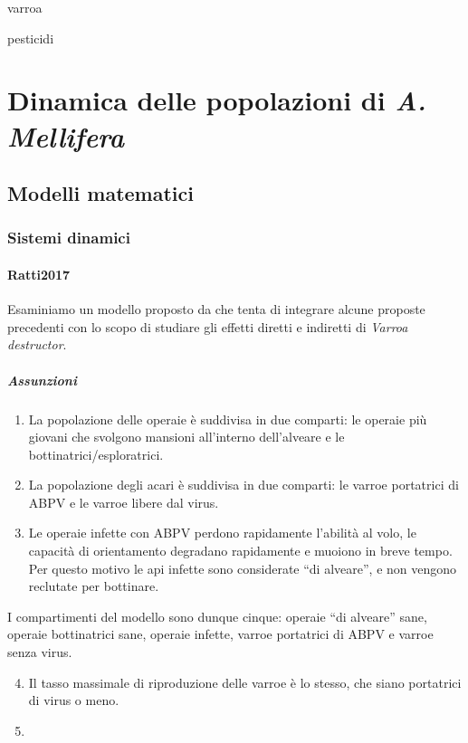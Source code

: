 \documentclass[11pt,a4paper]{book} %
\begin{document}
varroa

pesticidi


\mainmatter

\part{Dinamica delle popolazioni di \emph{A. Mellifera}}





\chapter[Modelli]{Modelli matematici}
\section{Sistemi dinamici}

\subsection{Ratti2017}
Esaminiamo un modello proposto da \citeauthor{ratti2017} che tenta di integrare alcune proposte precedenti con lo scopo di studiare gli effetti diretti e indiretti di \emph{Varroa destructor}.

\subsubsection{Assunzioni}
\begin{enumerate}
    \item La popolazione delle operaie è suddivisa in due comparti: le operaie più giovani che svolgono mansioni all'interno dell'alveare e le bottinatrici/esploratrici.
    \item La popolazione degli acari è suddivisa in due comparti: le varroe portatrici di ABPV e le varroe libere dal virus.
    \item Le operaie infette con ABPV perdono rapidamente l'abilità al volo, le capacità di orientamento degradano rapidamente e muoiono in breve tempo. Per questo motivo le api infette sono considerate ``di alveare'', e non vengono reclutate per bottinare.
\end{enumerate}

I compartimenti del modello sono dunque cinque: operaie ``di alveare'' sane, operaie bottinatrici sane, operaie infette, varroe portatrici di ABPV e varroe senza virus.

\begin{enumerate}
    \setcounter{enumi}{3}
    \item Il tasso massimale di riproduzione delle varroe è lo stesso, che siano portatrici di virus o meno.
    \item
\end{enumerate}
\end{document}
